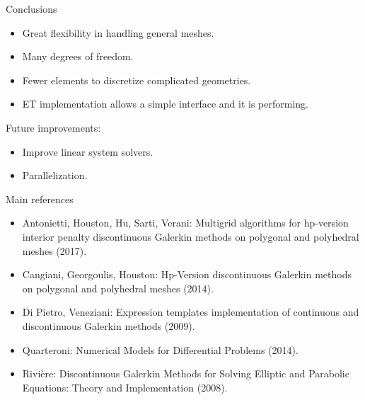 \documentclass{beamer}
\begin{document}
\begin{frame}{Conclusions}
	\begin{itemize}
		\item Great flexibility in handling general meshes.
		\item Many degrees of freedom.
		\item Fewer elements to discretize complicated geometries.
		\item ET implementation allows a simple interface and it is performing.
	\end{itemize}
	Future improvements:
	\begin{itemize}
		\item Improve linear system solvers.
		\item Parallelization.
	\end{itemize}
\end{frame}
\begin{frame}{Main references}
\begin{itemize}
	
	\item Antonietti, Houston, Hu, Sarti, Verani: Multigrid
	algorithms for hp-version interior penalty discontinuous Galerkin methods
	on polygonal and polyhedral meshes (2017).
	
	\item Cangiani, Georgoulis, Houston: Hp-Version discontinuous
	Galerkin methods on polygonal and polyhedral meshes (2014).
	
	\item Di Pietro, Veneziani: Expression templates implementation of continuous and discontinuous Galerkin methods (2009).
	
	\item Quarteroni: Numerical Models for Differential Problems (2014).
	
	\item Rivière: Discontinuous Galerkin Methods for Solving Elliptic and
		Parabolic Equations: Theory and Implementation (2008).
		
\end{itemize}
\end{frame}
\end{document}
